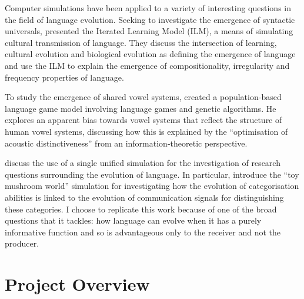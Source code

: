 \documentclass[12pt,a4paper]{report}
\begin{document}
Computer simulations have been applied to a variety of interesting questions in the field of language evolution. Seeking to investigate the emergence of syntactic universals, \citet{kirby2002emergence} presented the Iterated Learning Model (ILM), a means of simulating cultural transmission of language. They discuss the intersection of learning, cultural evolution and biological evolution as defining the emergence of language and use the ILM to explain the emergence of compositionality, irregularity and frequency properties of language.

To study the emergence of shared vowel systems, \citet{de1997generating} created a population-based language game model involving language games and genetic algorithms. He explores an apparent bias towards vowel systems that reflect the structure of human vowel systems, discussing how this is explained by the ``optimisation of acoustic distinctiveness'' from an information-theoretic perspective.

\citet{parisi2002unified} discuss the use of a single unified simulation for the investigation of research questions surrounding the evolution of language. In particular, \citet{Cangelosi1998} introduce the ``toy mushroom world'' simulation for investigating how the evolution of categorisation abilities is linked to the evolution of communication signals for distinguishing these categories. I choose to replicate this work because of one of the broad questions that it tackles: how language can evolve when it has a purely informative function and so is advantageous only to the receiver and not the producer. 


\section{Project Overview}
\end{document}
